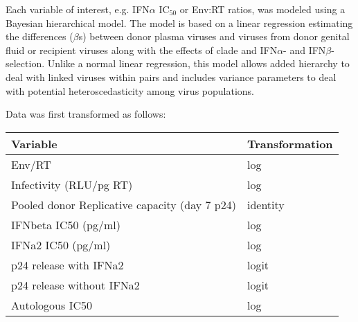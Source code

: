 \documentclass[12pt]{article}
\begin{document}
Each variable of interest, e.g. IFN$\alpha$ IC$_{50}$ or Env:RT ratios, was modeled using a Bayesian hierarchical model. The model is based on a linear regression estimating the differences ($\beta$s) between donor plasma viruses and viruses from donor genital fluid or recipient viruses along with the effects of clade and IFN$\alpha$- and IFN$\beta$-selection. Unlike a normal linear regression, this model allows added hierarchy to deal with linked viruses within pairs and includes variance parameters to deal with potential heteroscedasticity among virus populations.


Data was first transformed as follows:

\begin{table}[ht]
\centering
\begin{tabular}{|l|l|}
      \hline
      Variable                                      & Transformation \\ 
      \hline
      Env/RT                                        & log            \\ 
      Infectivity (RLU/pg RT)                       & log            \\ 
      Pooled donor Replicative capacity (day 7 p24) & identity       \\ 
      IFNbeta IC50 (pg/ml)                          & log            \\ 
      IFNa2 IC50 (pg/ml)                            & log            \\ 
      p24 release with IFNa2                        & logit          \\ 
      p24 release without IFNa2                     & logit          \\ 
      Autologous IC50                               & log            \\ 
      \hline
\end{tabular}
\end{table}
\end{document}
